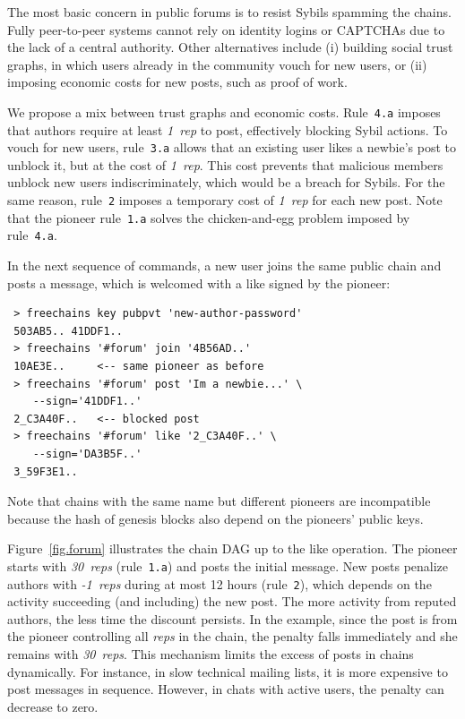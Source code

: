 \documentclass[10pt,journal,compsoc]{IEEEtran}
\newcommand{\reps}     {\emph{reps}\xspace}
\newcommand{\onerep}   {\emph{1~rep}\xspace}
\newcommand{\nreps}[1] {\emph{#1~reps\xspace}}
\begin{document}
The most basic concern in public forums is to resist Sybils spamming the
chains.
Fully peer-to-peer systems cannot rely on identity logins or CAPTCHAs due
to the lack of a central authority.
Other alternatives include (i) building social trust graphs, in which users
already in the community vouch for new users, or (ii) imposing economic costs
for new posts, such as proof of work.

We propose a mix between trust graphs and economic costs.
%
Rule~\texttt{4.a} imposes that authors require at least \onerep to post,
effectively blocking Sybil actions.
To vouch for new users, rule~\texttt{3.a} allows that an existing user likes a
newbie's post to unblock it, but at the cost of \onerep.
This cost prevents that malicious members unblock new users indiscriminately,
which would be a breach for Sybils.
For the same reason, rule~\texttt{2} imposes a temporary cost of \onerep for
each new post.
%
Note that the pioneer rule~\texttt{1.a} solves the chicken-and-egg problem
imposed by rule~\texttt{4.a}.

In the next sequence of commands, a new user joins the same public chain and
posts a message, which is welcomed with a like signed by the pioneer:

{\footnotesize
\begin{verbatim}
 > freechains key pubpvt 'new-author-password'
 503AB5.. 41DDF1..
 > freechains '#forum' join '4B56AD..'
 10AE3E..     <-- same pioneer as before
 > freechains '#forum' post 'Im a newbie...' \
    --sign='41DDF1..'
 2_C3A40F..   <-- blocked post
 > freechains '#forum' like '2_C3A40F..' \
    --sign='DA3B5F..'
 3_59F3E1..
\end{verbatim}
}

Note that chains with the same name but different pioneers are incompatible
because the hash of genesis blocks also depend on the pioneers' public keys.

Figure~\ref{fig.forum} illustrates the chain DAG up to the like operation.
The pioneer starts with \nreps{30} (rule~\texttt{1.a}) and posts the initial
message.
%
New posts penalize authors with \nreps{-1} during at most 12 hours
(rule~\texttt{2}), which depends on the activity succeeding (and including) the
new post.
The more activity from reputed authors, the less time the discount persists.
In the example, since the post is from the pioneer controlling all \reps in the
chain, the penalty falls immediately and she remains with \nreps{30}.
This mechanism limits the excess of posts in chains dynamically.
For instance, in slow technical mailing lists, it is more expensive to post
messages in sequence.
However, in chats with active users, the penalty can decrease to zero.
\end{document}
